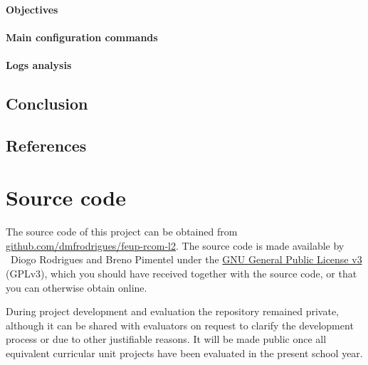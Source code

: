\documentclass[a4paper, 11pt]{report}
\begin{document}
\subsubsection{Objectives} \label{sec:Obj6}
\subsubsection{Main configuration commands} \label{sec:Com6}
\subsubsection{Logs analysis} \label{sec:Log6}

\section*{Conclusion} \label{sec:Conclusion}

\section*{References} \label{sec:References}

\appendix
\appendixpage
\addappheadtotoc
\chapter{Source code}

The source code of this project can be obtained from \href{https://github.com/dmfrodrigues/feup-rcom-l2}{github.com/dmfrodrigues/feup-rcom-l2}.
The source code is made available by \textcopyright~Diogo Rodrigues and Breno Pimentel under the \href{https://www.gnu.org/licenses/gpl-3.0.en.html}{GNU General Public License v3} (GPLv3), which you should have received together with the source code, or that you can otherwise obtain online.

During project development and evaluation the repository remained private, although it can be shared with evaluators on request to clarify the development process or due to other justifiable reasons.
It will be made public once all equivalent curricular unit projects have been evaluated in the present school year.

\fancyhfoffset{0pt}



\end{document}
